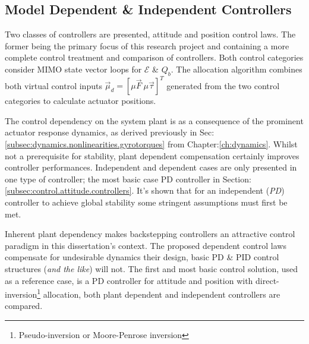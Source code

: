 \subsection*{Model Dependent \& Independent Controllers}
Two classes of controllers are presented, attitude and position control laws. The former being the primary focus of this research project and containing a more complete control treatment and comparison of controllers. Both control categories consider MIMO state vector loops for $\mathcal{E}$ \& $Q_b$. The allocation algorithm combines both virtual control inputs $\vec{\mu}_d=[\mu\vec{F}~\mu\vec{\tau}]^T$ generated from the two control categories to calculate actuator positions.
\par
The control dependency on the system plant is as a consequence of the prominent actuator response dynamics, as derived previously in Sec:\ref{subsec:dynamics.nonlinearities.gyrotorques} from Chapter:\ref{ch:dynamics}. Whilst not a prerequisite for stability, plant dependent compensation certainly improves controller performances. Independent and dependent cases are only presented in one type of controller; the most basic case PD controller in Section:\ref{subsec:control.attitude.controllers}. It's shown that for an independent (\emph{PD}) controller to achieve global stability some stringent assumptions must first be met.
\par
Inherent plant dependency makes backstepping controllers an attractive control paradigm in this dissertation's context. The proposed dependent control laws compensate for undesirable dynamics their design, basic PD \& PID control structures (\emph{and the like}) will not. The first and most basic control solution, used as a reference case, is a PD controller for attitude and position with direct-inversion\footnote{Pseudo-inversion or Moore-Penrose inversion} allocation, both plant dependent and independent controllers are compared.
